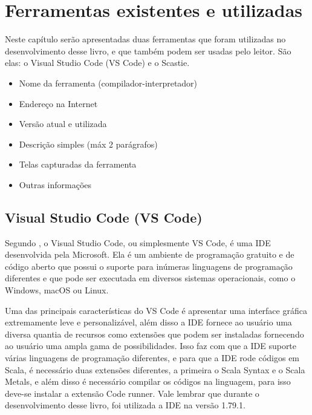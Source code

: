 


\chapter{Ferramentas existentes e utilizadas}

Neste capítulo serão apresentadas duas ferramentas que foram utilizadas no desenvolvimento desse livro, e que também podem ser usadas pelo leitor. São elas: o Visual Studio Code (VS Code) e o Scastie.
\begin{itemize}
  \item Nome da ferramenta (compilador-interpretador)
  \item Endere\c{c}o na Internet
  \item Vers\~{a}o atual e utilizada
  \item Descri\c{c}\~{a}o simples (m\'{a}x 2 par\'{a}grafos)
  \item Telas capturadas da ferramenta
  \item Outras informa\c{c}\~{o}es
\end{itemize}


    \section{Visual Studio Code (VS Code)}
	Segundo \cite{Plainer}, o Visual Studio Code, ou simplesmente VS Code, é uma IDE desenvolvida pela Microsoft. Ela é um ambiente de programação gratuito e de código aberto que possui o suporte para inúmeras linguagens de programação diferentes e que pode ser executada em diversos sistemas operacionais, como o Windows, macOS ou Linux.
	
	Uma das principais características do VS Code é apresentar uma interface gráfica extremamente leve e personalizável, além disso a IDE fornece ao usuário uma diversa quantia de recursos como extensões que podem ser instaladas fornecendo ao usuário uma ampla gama de possibilidades. Isso faz com que a IDE suporte várias linguagens de programação diferentes, e para que a IDE rode códigos em Scala, é necessário duas extensões diferentes, a primeira o Scala Syntax e o Scala Metals, e além disso é necessário compilar os códigos na linguagem, para isso deve-se instalar a extensão Code runner. Vale lembrar que durante o desenvolvimento desse livro, foi utilizada a IDE na versão 1.79.1.
	

